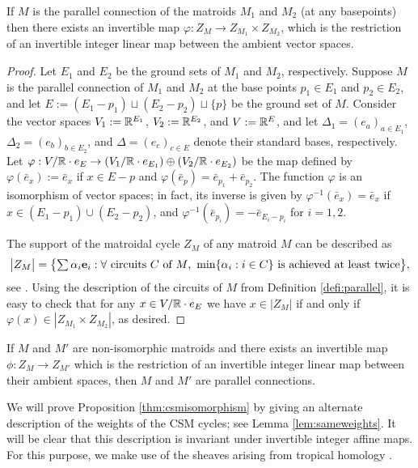 \begin{prop}\label{prop:parallelBergman}
If $M$ is the parallel connection of the matroids $M_1$ and $M_2$ (at any basepoints) then there exists an invertible map
$\varphi: Z_M \to Z_{M_1} \times Z_{M_2}$, which is the restriction of an invertible integer linear map between the ambient vector spaces.  
\end{prop}
\begin{proof}
Let $E_1$ and $E_2$ be the ground sets of $M_1$ and $M_2$, respectively. Suppose $M$ is the parallel connection of $M_1$ and $M_2$ at the base points $p_1 \in E_1$ and $p_2 \in E_2$, and let $E := (E_1 - p_1) \sqcup (E_2 - p_2) \sqcup \{p\}$ be the ground set of $M$. Consider the vector spaces $V_1 := {\mathbb R}^{E_1}$, $V_2 := {\mathbb R}^{E_2}$, and $V := {\mathbb R}^{E}$, and let $\Delta_1 = (e_a)_{a \in E_1}$, $\Delta_2 = (e_b)_{b \in E_2}$, and $\Delta = (e_c)_{c \in E}$ denote their standard bases, respectively. Let $\varphi: V/ {\mathbb R} \cdot e_{E} \to (V_1/ {\mathbb R} \cdot e_{E_1}) \oplus (V_2/ {\mathbb R} \cdot e_{E_2})$ be the map defined by $\varphi(\bar e_x) := \bar e_x$ if $x \in E - p$ and $\varphi(\bar e_p) = \bar e_{p_1} + \bar e_{p_2}$. The function $\varphi$ is an isomorphism of vector spaces; in fact, its inverse is given by $\varphi^{-1}(\bar e_x) = \bar e_x$ if $x \in (E_1 - p_1) \cup (E_2 - p_2)$, and $\varphi^{-1}(\bar e_{p_i}) = -\bar e_{E_i-p_i}$ for $i=1,2$. 

The support of the matroidal cycle
$Z_M$ of any matroid $M$  can be described as
\[\textstyle \bigl|Z_M\bigr| = \bigl\{\sum \alpha_i \mathbf e_i : 
\forall \text{ circuits $C$ of $M$, } \min \{\alpha_i : i \in C\} \text{ is achieved at least twice} \bigr\},\] see \cite[Theorem 4.2.6]{MaclaganSturmfels}. 
Using the description of the circuits of $M$ from Definition \ref{defi:parallel}, it is easy to check that for any $x \in V/ {\mathbb R} \cdot e_{E}$ we have $x \in |Z_M|$ if and only if $\varphi(x) \in |Z_{M_1} \times Z_{M_2}|$, as desired.
\end{proof}



\begin{conj}\label{conj:iso}
If $M$ and $M'$ are non-isomorphic matroids and there exists an invertible map  $\phi: Z_M \to Z_{M'}$  which is the restriction of an invertible integer linear map between their ambient spaces, then $M$ and $M'$ are parallel connections.   
\end{conj} 


We will prove Proposition \ref{thm:csmisomorphism} by 
giving an alternate description of the weights of the CSM cycles; see Lemma \ref{lem:sameweights}. 
It will be clear that this description is invariant under invertible integer affine maps. 
For this purpose, we make use of the sheaves arising from tropical homology \cite{IKMZ}.


